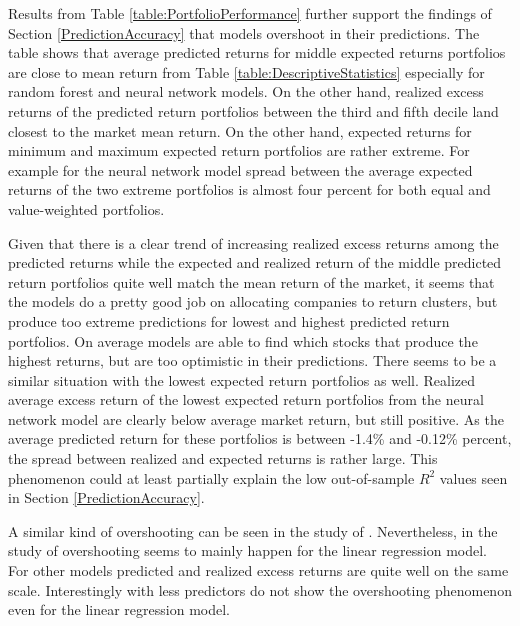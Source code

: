 \documentclass[12pt]{article}
\begin{document}
Results from Table \ref{table:PortfolioPerformance} further support the findings of Section \ref{PredictionAccuracy} that models overshoot in their predictions. The table shows that average predicted returns for middle expected returns portfolios are close to mean return from Table \ref{table:DescriptiveStatistics} especially for random forest and neural network models. On the other hand, realized excess returns of the predicted return portfolios between the third and fifth decile land closest to the market mean return. On the other hand, expected returns for minimum and maximum expected return portfolios are rather extreme. For example for the neural network model spread between the average expected returns of the two extreme portfolios is almost four percent for both equal and value-weighted portfolios. \par

Given that there is a clear trend of increasing realized excess returns among the predicted returns while the expected and realized return of the middle predicted return portfolios quite well match the mean return of the market, it seems that the models do a pretty good job on allocating companies to return clusters, but produce too extreme predictions for lowest and highest predicted return portfolios. On average models are able to find which stocks that produce the highest returns, but are too optimistic in their predictions. There seems to be a similar situation with the lowest expected return portfolios as well. Realized average excess return of the lowest expected return portfolios from the neural network model are clearly below average market return, but still positive. As the average predicted return for these portfolios is between -1.4\% and -0.12\% percent, the spread between realized and expected returns is rather large. This phenomenon could at least partially explain the low out-of-sample $R^2$ values seen in Section \ref{PredictionAccuracy}. \par  

A similar kind of overshooting can be seen in the study of \citet{Drobetz}. Nevertheless, in the study of \citeauthor{Drobetz} overshooting seems to mainly happen for the linear regression model. For other models predicted and realized excess returns are quite well on the same scale. Interestingly with less predictors \citet{Fieberg} do not show the overshooting phenomenon even for the linear regression model. \par
\end{document}
